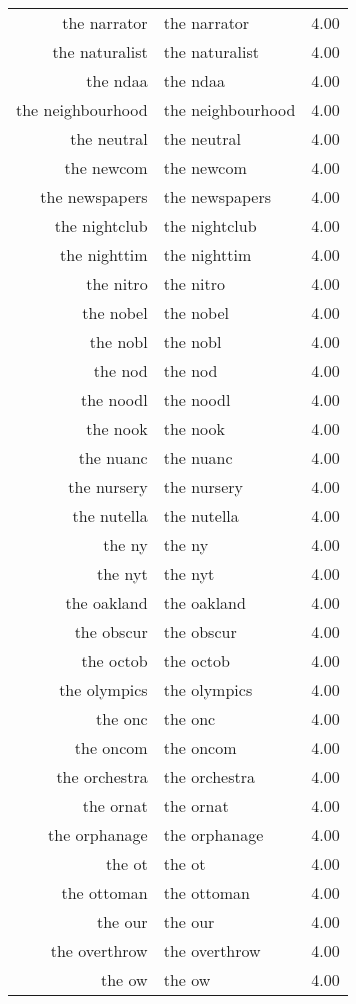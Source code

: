 \begin{table}[ht]
\begin{tabular}{rlr}
  the narrator & the narrator & 4.00 \\ 
  the naturalist & the naturalist & 4.00 \\ 
  the ndaa & the ndaa & 4.00 \\ 
  the neighbourhood & the neighbourhood & 4.00 \\ 
  the neutral & the neutral & 4.00 \\ 
  the newcom & the newcom & 4.00 \\ 
  the newspapers & the newspapers & 4.00 \\ 
  the nightclub & the nightclub & 4.00 \\ 
  the nighttim & the nighttim & 4.00 \\ 
  the nitro & the nitro & 4.00 \\ 
  the nobel & the nobel & 4.00 \\ 
  the nobl & the nobl & 4.00 \\ 
  the nod & the nod & 4.00 \\ 
  the noodl & the noodl & 4.00 \\ 
  the nook & the nook & 4.00 \\ 
  the nuanc & the nuanc & 4.00 \\ 
  the nursery & the nursery & 4.00 \\ 
  the nutella & the nutella & 4.00 \\ 
  the ny & the ny & 4.00 \\ 
  the nyt & the nyt & 4.00 \\ 
  the oakland & the oakland & 4.00 \\ 
  the obscur & the obscur & 4.00 \\ 
  the octob & the octob & 4.00 \\ 
  the olympics & the olympics & 4.00 \\ 
  the onc & the onc & 4.00 \\ 
  the oncom & the oncom & 4.00 \\ 
  the orchestra & the orchestra & 4.00 \\ 
  the ornat & the ornat & 4.00 \\ 
  the orphanage & the orphanage & 4.00 \\ 
  the ot & the ot & 4.00 \\ 
  the ottoman & the ottoman & 4.00 \\ 
  the our & the our & 4.00 \\ 
  the overthrow & the overthrow & 4.00 \\ 
  the ow & the ow & 4.00 \\ 

\end{tabular}
\end{table}
